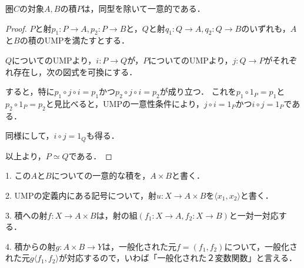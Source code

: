 \documentclass[uplatex, dvipdfmx]{jsarticle}
\begin{document}
\begin{proposition}\label{prop-UMP-prod}
    圏$C$の対象$A,B$の積$P$は，同型を除いて一意的である．
\end{proposition}
\begin{proof}
    $P$と射$p_1:P\to A, p_2:P\to B$と，$Q$と射$q_1:Q\to A,q_2:Q\to B$のいずれも，$A$と$B$の積のUMPを満たすとする．

    $Q$についてのUMPより，$i:P\to Q$が，$P$についてのUMPより，$j:Q\to P$がそれぞれ存在し，次の図式を可換にする．
    \begin{center}
    \end{center}
    すると，特に$p_1\circ j\circ i=p_1$かつ$p_2\circ j\circ i=p_2$が成り立つ．
    これを$p_1\circ 1_P=p_1$と$p_2\circ 1_P=p_2$と見比べると，UMPの一意性条件により，$j\circ i=1_P$かつ$i\circ j=1_P$である．

    同様にして，$i\circ j=1_Q$も得る．

    以上より，$P\simeq Q$である．
\end{proof}
\begin{notation*}
    1. この$A$と$B$についての一意的な積を，$A\times B$と書く．

    2. UMPの定義内にある記号について，射$u:X\to A\times B$を$\langle x_1,x_2\rangle$と書く．

    3. 積への射$f:X\to A\times B$は，射の組$(f_1:X\to A,f_2:X\to B)$と一対一対応する．

    4. 積からの射$g:A\times B\to Y$は，一般化された元$f=(f_1,f_2)$について，一般化された元$g\langle f_1,f_2\rangle$が対応するので，いわば「一般化された２変数関数」と言える．
    \begin{center}
    \end{center}
\end{notation*}
\end{document}
